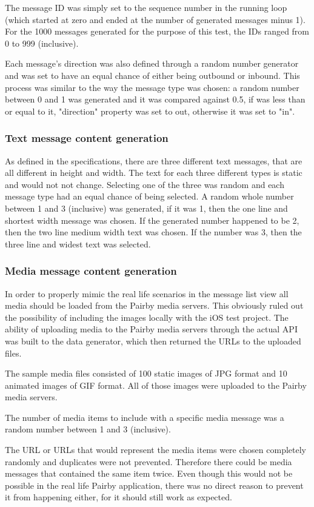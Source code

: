 \documentclass[a4paper,12pt]{article}
\begin{document}
The message ID was simply set to the sequence number in the running loop (which started at zero and ended at the number of generated messages minus 1). For the 1000 messages generated for the purpose of this test, the IDs ranged from 0 to 999 (inclusive).

Each message's direction was also defined through a random number generator and was set to have an equal chance of either being outbound or inbound. This process was similar to the way the message type was chosen: a random number between 0 and 1 was generated and it was compared against 0.5, if was less than or equal to it, "direction" property was set to out, otherwise it was set to "in".

\subsubsection*{Text message content generation}
As defined in the specifications, there are three different text messages, that are all different in height and width. The text for each three different types is static and would not not change. Selecting one of the three was random and each message type had an equal chance of being selected. A random whole number between 1 and 3 (inclusive) was generated, if it was 1, then the one line and shortest width message was chosen. If the generated number happened to be 2, then the two line medium width text was chosen. If the number was 3, then the three line and widest text was selected.

\subsubsection*{Media message content generation}
In order to properly mimic the real life scenarios in the message list view all media should be loaded from the Pairby media servers. This obviously ruled out the possibility of including the images locally with the iOS test project. The ability of uploading media to the Pairby media servers through the actual API was built to the data generator, which then returned the URLs to the uploaded files.

The sample media files consisted of 100 static images of JPG format and 10 animated images of GIF format. All of those images were uploaded to the Pairby media servers.

The number of media items to include with a specific media message was a random number between 1 and 3 (inclusive).

The URL or URLs that would represent the media items were chosen completely randomly and duplicates were not prevented. Therefore there could be media messages that contained the same item twice. Even though this would not be possible in the real life Pairby application, there was no direct reason to prevent it from happening either, for it should still work as expected.
\end{document}
